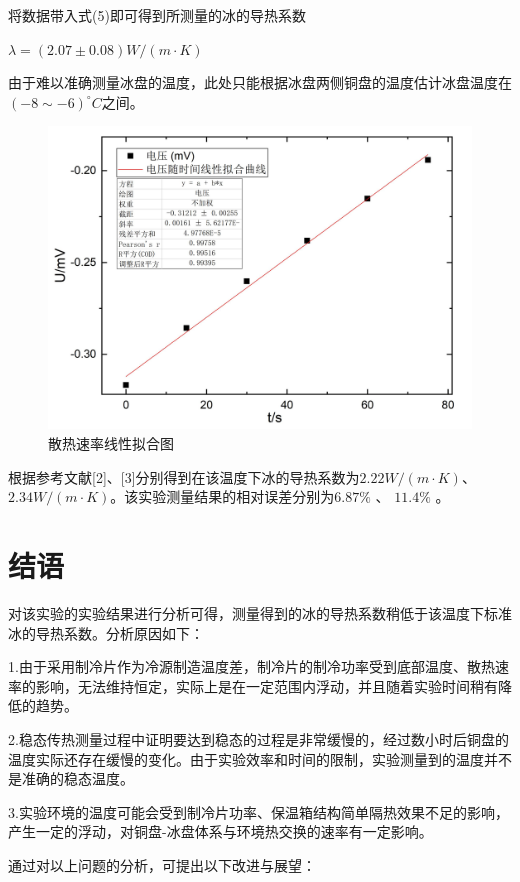 \documentclass{article}
\begin{document}
将数据带入式(5)即可得到所测量的冰的导热系数
\begin{center}
	$ \lambda=(2.07\pm0.08)W/(m\cdot K) $
\end{center}
由于难以准确测量冰盘的温度，此处只能根据冰盘两侧铜盘的温度估计冰盘温度在$(-8\sim-6)  ^{\circ}C $之间。
  \begin{figure}
	\centering
	\includegraphics[scale=0.12]{T2散热速率1}
	\caption{\heiti{}散热速率线性拟合图}
	
\end{figure}


根据参考文献[2]、[3]分别得到在该温度下冰的导热系数为$ 2.22W/(m\cdot K) $、$ 2.34W/(m\cdot K) $。该实验测量结果的相对误差分别为$ 6.87\%$ 、 $11.4\% $ 。
\section{结语}
对该实验的实验结果进行分析可得，测量得到的冰的导热系数稍低于该温度下标准冰的导热系数。分析原因如下：


1.由于采用制冷片作为冷源制造温度差，制冷片的制冷功率受到底部温度、散热速率的影响，无法维持恒定，实际上是在一定范围内浮动，并且随着实验时间稍有降低的趋势。


2.稳态传热测量过程中证明要达到稳态的过程是非常缓慢的，经过数小时后铜盘的温度实际还存在缓慢的变化。由于实验效率和时间的限制，实验测量到的温度并不是准确的稳态温度。


3.实验环境的温度可能会受到制冷片功率、保温箱结构简单隔热效果不足的影响，产生一定的浮动，对铜盘-冰盘体系与环境热交换的速率有一定影响。


通过对以上问题的分析，可提出以下改进与展望：
\end{document}
